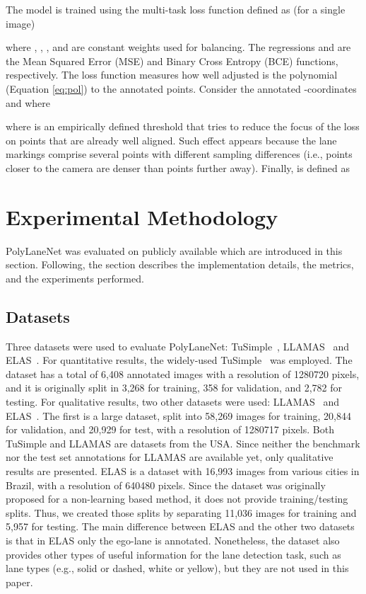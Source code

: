 \documentclass[a4paper,conference]{IEEEtran}
\newcommand{\methodname}{PolyLaneNet}
\begin{document}
The model is trained using the multi-task loss function defined as (for a single image)

where , , , and  are constant weights used for balancing. The regressions  and  are the Mean Squared Error (MSE) and Binary Cross Entropy (BCE) functions, respectively. The  loss function measures how well adjusted is the polynomial  (Equation \ref{eq:pol}) to the annotated points. Consider the annotated -coordinates  and  where

where  is an empirically defined threshold that tries to reduce the focus of the loss on points that are already well aligned. Such effect appears because the lane markings comprise several points with different sampling differences (i.e., points closer to the camera are denser than points further away). Finally,  is defined as












 \section{Experimental Methodology}


\label{sec:experiments}

\methodname{} was evaluated on publicly available which are introduced in this section. Following, the section describes the implementation details, the metrics, and the experiments performed.

\subsection{Datasets}
Three datasets were used to evaluate \methodname: TuSimple~\cite{tusimple-benchmark}, LLAMAS~\cite{llamas2019} and ELAS~\cite{berriel2017imavis}. For quantitative results, the widely-used TuSimple~\cite{tusimple-benchmark} was employed. The dataset has a total of 6,408 annotated images with a resolution of 1280720 pixels, and it is originally split in 3,268 for training, 358 for validation, and 2,782 for testing. For qualitative results, two other datasets were used: LLAMAS~\cite{llamas2019} and ELAS~\cite{berriel2017imavis}. The first is a large dataset, split into 58,269 images for training, 20,844 for validation, and 20,929 for test, with a resolution of 1280717 pixels. Both TuSimple and LLAMAS are datasets from the USA. Since neither the benchmark nor the test set annotations for LLAMAS are available yet, only qualitative results are presented. ELAS is a dataset with 16,993 images from various cities in Brazil, with a resolution of 640480 pixels. Since the dataset was originally proposed for a non-learning based method, it does not provide training/testing splits. Thus, we created those splits by separating 11,036 images for training and 5,957 for testing. The main difference between ELAS and the other two datasets is that in ELAS only the ego-lane is annotated. Nonetheless, the dataset also provides other types of useful information for the lane detection task, such as lane types (e.g., solid or dashed, white or yellow), but they are not used in this paper.
\end{document}
